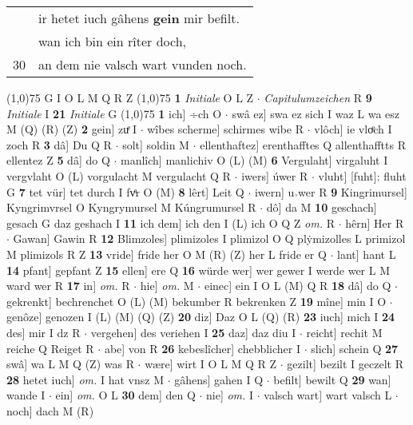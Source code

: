 \documentclass[8pt,a4paper,notitlepage]{article}
\begin{document}
\begin{table}[ht]
\begin{minipage}[t]{0.5\linewidth}
\begin{tabular}{rl}
 & ir hetet iuch gâhens \textbf{gein} mir befilt.\\ 
 & wan ich bin ein rîter doch,\\ 
30 & an dem nie valsch wart vunden noch.\\ 
\end{tabular}
\scriptsize
\line(1,0){75} \newline
G I O L M Q R Z \newline
\line(1,0){75} \newline
\textbf{1} \textit{Initiale} O L Z   $\cdot$ \textit{Capitulumzeichen} R  \textbf{9} \textit{Initiale} I  \textbf{21} \textit{Initiale} G  \newline
\line(1,0){75} \newline
\textbf{1} ich] ÷ch O  $\cdot$ swâ ez] swa ez sich I waz L wa esz M (Q) (R) (Z) \textbf{2} gein] zuͤ I  $\cdot$ wîbes scherme] schirmes wibe R  $\cdot$ vlôch] ie vloͤch I zoch R \textbf{3} dâ] Du Q R  $\cdot$ solt] soldin M  $\cdot$ ellenthaftez] erenthafftes Q allenthafftts R ellentez Z \textbf{5} dâ] do Q  $\cdot$ manlîch] manlichiv O (L) (M) \textbf{6} Vergulaht] virgaluht I vergvlaht O (L) vorgulacht M vergulacht Q R  $\cdot$ iwers] úwer R  $\cdot$ vluht] [fuht]: fluht G \textbf{7} tet vür] tet durch I fvͤr O (M) \textbf{8} lêrt] Leit Q  $\cdot$ iwern] u˒wer R \textbf{9} Kingrimursel] Kyngrimvrsel O Kyngrymursel M Kúngrumursel R  $\cdot$ dô] da M \textbf{10} geschach] gesach G daz geshach I \textbf{11} ich dem] ich den I (L) ich O Q Z \textit{om.} R  $\cdot$ hêrn] Her R  $\cdot$ Gawan] Gawin R \textbf{12} Blimzoles] plimizoles I plimizol O Q plẏmizolles L primizol M plimizols R Z \textbf{13} vride] fride her O M (R) (Z) her L fride er Q  $\cdot$ lant] hant L \textbf{14} pfant] gepfant Z \textbf{15} ellen] ere Q \textbf{16} würde wer] wer gewer I werde wer L M ward wer R \textbf{17} in] \textit{om.} R  $\cdot$ hie] \textit{om.} M  $\cdot$ einec] ein I O L (M) Q R \textbf{18} dâ] do Q  $\cdot$ gekrenkt] bechrenchet O (L) (M) bekumber R bekrenken Z \textbf{19} mîne] min I O  $\cdot$ genôze] genozen I (L) (M) (Q) (Z) \textbf{20} diz] Daz O L (Q) (R) \textbf{23} iuch] mich I \textbf{24} des] mir I dz R  $\cdot$ vergehen] des veriehen I \textbf{25} daz] daz diu I  $\cdot$ reicht] rechit M reiche Q Reiget R  $\cdot$ abe] von R \textbf{26} kebeslîcher] chebblicher I  $\cdot$ slich] schein Q \textbf{27} swâ] wa L M Q (Z) was R  $\cdot$ wære] wirt I O L M Q R Z  $\cdot$ gezilt] bezilt I geczelt R \textbf{28} hetet iuch] \textit{om.} I hat vnsz M  $\cdot$ gâhens] gahen I Q  $\cdot$ befilt] bewilt Q \textbf{29} wan] wande I  $\cdot$ ein] \textit{om.} O L \textbf{30} dem] den Q  $\cdot$ nie] \textit{om.} I  $\cdot$ valsch wart] wart valsch L  $\cdot$ noch] dach M (R) \newline

\end{minipage}
\end{table}
\end{document}
